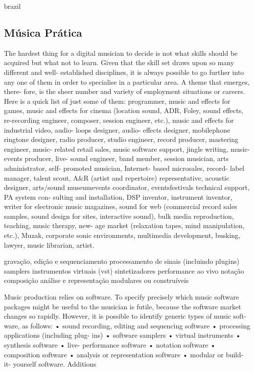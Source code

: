 \begin{otherlanguage*}{brazil}
\subsection{Música Prática}

\begin{citacao}


The hardest thing for a digital musician to decide is not what skills should be acquired but what not to learn. Given that the skill set draws upon so many different and well- established disciplines, it is always possible to go further into any one of them in order to specialise in a particular area. A theme that emerges, there- fore, is the sheer number and variety of employment situations or careers. Here is a quick list of just some of them: programmer, music and effects for games, music and effects for cinema (location sound, ADR, Foley, sound effects, re-recording engineer, composer, session engineer, etc.), music and effects for industrial video, audio- loops designer, audio- effects designer, mobilephone ringtone designer, radio producer, studio engineer, record producer, mastering engineer, music- related retail sales, music software support, jingle writing, music- events producer, live- sound engineer, band member, session musician, arts administrator, self- promoted musician, Internet- based microsales, record- label manager, talent scout, A\&R (artist and repertoire) representative, acoustic designer, arts/sound museum\/events coordinator, events\/festivals technical support, PA system con- sulting and installation, DSP inventor, instrument inventor, writer for electronic music magazines, sound for web (commercial record sales samples, sound design for sites, interactive sound), bulk media reproduction, teaching, music therapy, new- age market (relaxation tapes, mind manipulation, etc.), Muzak, corporate sonic environments, multimedia development, busking, lawyer, music librarian, artist.\cite[191]{Hugill2012}
\end{citacao}


gravação, edição e sequenciamento
processamento de sinais (incluindo plugins)
samplers
instrumentos virtuais (vst)
sintetizadores
performance ao vivo
notação
composição
análise e representação
modulares ou construíveis

\begin{citacao}
Music production relies on software. To specify precisely which music software packages might be useful to the musician is futile, because the software market changes so rapidly. However, it is possible to identify generic types of music soft- ware, as follows:
• sound recording, editing and sequencing software • processing applications (including plug- ins) • software samplers • virtual instruments • synthesis software • live- performance software • notation software • composition software • analysis or representation software • modular or build- it- yourself software.\cite[195]{Hugill2012}
Additions
\end{citacao}



\end{otherlanguage*}
